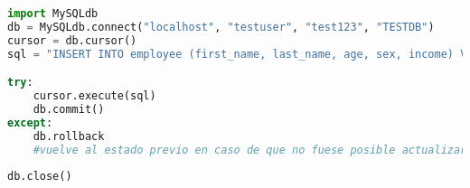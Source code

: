 \begin{lstlisting}[language=Python]
import MySQLdb
db = MySQLdb.connect("localhost", "testuser", "test123", "TESTDB")
cursor = db.cursor()
sql = "INSERT INTO employee (first_name, last_name, age, sex, income) VALUES ('%s', '%s', '%d', '%c', '%d')" % ('Marc', 'Mohan', 20, 'M', 2000)

try:
	cursor.execute(sql)
	db.commit()
except:
	db.rollback 
	#vuelve al estado previo en caso de que no fuese posible actualizar todos los datos a la base de datos por una caída o así
	
db.close()
\end{lstlisting}